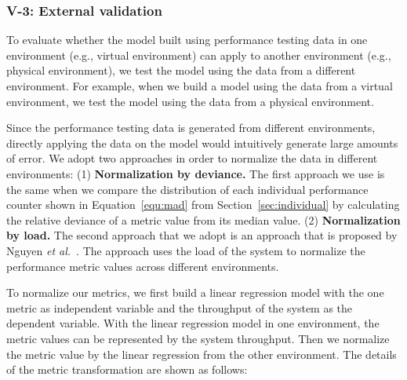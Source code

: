 \subsubsection{V-3: External validation}
To evaluate whether the model built using performance testing data in one environment (e.g., virtual environment) can apply to another environment (e.g., physical environment), we test the model using the data from a different environment. For example, when we build a model using the data from a virtual environment, we test the model using the data from a physical environment. 

Since the performance testing data is generated from different environments, directly applying the data on the model would intuitively generate large amounts of error. We adopt two approaches in order to normalize the data in different environments: (1) \textbf{Normalization by deviance.} The first approach we use is the same when we compare the distribution of each individual performance counter shown in Equation~\ref{equ:mad} from Section~\ref{sec:individual} by calculating the relative deviance of a metric value from its median value. (2) \textbf{Normalization by load.} The second approach that we adopt is an approach that is proposed by Nguyen \textit{et al.}~\cite{Nguyen:2012:ADP:2188286.2188344}. The approach uses the load of the system to normalize the performance metric values across different environments. 



To normalize our metrics, we first build a linear regression model with the one metric as independent variable and the throughput of the system as the dependent variable. With the linear regression model in one environment, the metric values can be represented by the system throughput. Then we normalize the metric value by the linear regression from the other environment. The details of the metric transformation are shown as follows:

